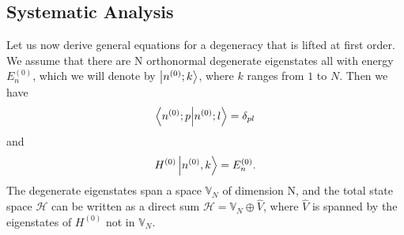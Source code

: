 \subsection* {Systematic Analysis}
Let us now derive general equations for a degeneracy that is lifted at first order.
We assume that there are N orthonormal degenerate eigenstates all with energy $E_n^{(0)}$, which we will denote by $\left| n^{(0)}; k \right\rangle$, where $k$ ranges from $1$ to $N$. Then we have \[\left\langle n^{(0)};p \middle| n^{(0)};l \right\rangle = \delta_{pl} \] and \[ H^{(0)} \left| n^{(0)},k \right\rangle = E_n^{(0)}. \] The degenerate eigenstates span a space $\mathbb{V}_N$ of dimension N, and the total state space $\mathcal{H}$ can be written as a direct sum $\mathcal{H} = \mathbb{V}_N \oplus \hat{V}$, where $\hat{V}$ is spanned by the eigenstates of $H^{(0)}$ not in $\mathbb{V}_N$.

